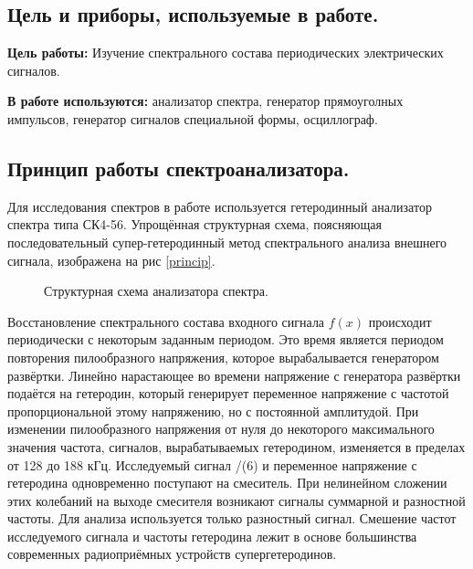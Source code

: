 \documentclass[a4paper,12pt]{article} %
\begin{document}
\subsection{Цель и приборы, используемые в работе.}

\textbf{Цель работы:} Изучение спектрального состава периодических электрических сигналов.

\textbf{В работе используются:} анализатор спектра, генератор прямоуголных импульсов, генератор сигналов специальной формы, осциллограф.

\subsection{Принцип работы спектроанализатора.}

Для исследования спектров в работе используется гетеродинный анализатор спектра типа СК4-56. Упрощённая структурная схема, поясняющая последовательный супер-гетеродинный метод спектрального анализа внешнего сигнала, изображена на рис \eqref{princip}.

\begin{figure}[H]\label{princip}
 	\caption{Структурная схема анализатора спектра.}
\label{fig:image2}
\end{figure}

Восстановление спектрального состава входного сигнала $f(x)$ происходит периодически с некоторым заданным периодом. Это время является периодом повторения пилообразного напряжения, которое вырабалывается генератором развёртки. Линейно нарастающее во времени напряжение с генератора развёртки подаётся на гетеродин, который генерирует переменное напряжение с частотой пропорциональной этому напряжению, но с постоянной амплитудой. При изменении пилообразного напряжения от нуля до некоторого максимального значения частота, сигналов, вырабатываемых гетеродином, изменяется в пределах от 128 до 188 кГц. Исследуемый сигнал /(6) и переменное напряжение с гетеродина одновременно поступают на смеситель. При нелинейном сложении этих колебаний на выходе смесителя возникают сигналы суммарной и разностной частоты. Для анализа используется только разностный сигнал. Смешение частот исследуемого сигнала и частоты гетеродина лежит в основе большинства современных радиоприёмных устройств супергетеродинов.
\end{document}
